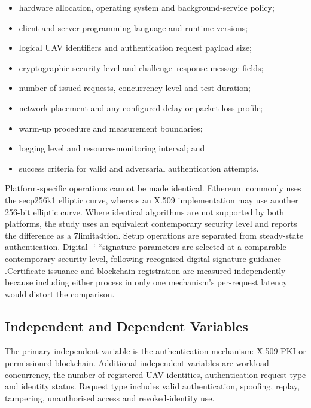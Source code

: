 \begin{itemize}
    \item hardware allocation, operating system and background-service policy;
    \item client and server programming language and runtime versions;
    \item logical UAV identifiers and authentication request payload size;
    \item cryptographic security level and challenge--response message fields;
    \item number of issued requests, concurrency level and test duration;
    \item network placement and any configured delay or packet-loss profile;
    \item warm-up procedure and measurement boundaries;
    \item logging level and resource-monitoring interval; and
    \item success criteria for valid and adversarial authentication attempts.
\end{itemize}
\noindent
Platform-specific operations cannot be made identical. Ethereum commonly uses the secp256k1 elliptic curve, whereas an X.509 implementation may use another 256-bit elliptic curve. Where identical algorithms are not supported by both platforms, the study uses an equivalent contemporary security level and reports the difference as a 7limita4tion. Setup operations are separated from steady-state authentication. Digital-
`   ``signature parameters are selected at a comparable contemporary security level, following recognised digital-signature guidance
\cite{NISTFIPS1865}.Certificate issuance and blockchain registration are measured independently because including either process in only one mechanism's per-request latency would distort the comparison.

\subsection{Independent and Dependent Variables}
\label{subsec:variables}

The primary independent variable is the authentication mechanism: X.509 PKI or permissioned blockchain. Additional independent variables are workload concurrency, the number of registered UAV identities, authentication-request type and identity status. Request type includes valid authentication, spoofing, replay, tampering, unauthorised access and revoked-identity use.

